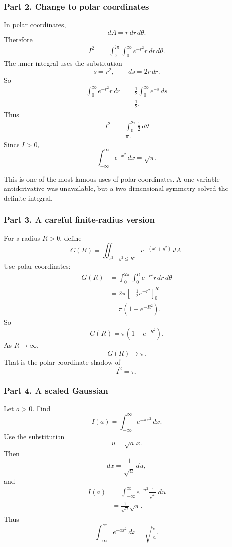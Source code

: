 \subsubsection*{Part 2. Change to polar coordinates}

In polar coordinates,
\[
    dA=r\,dr\,d\theta.
\]
Therefore
\[
\begin{aligned}
I^2
&=
\int_0^{2\pi}\int_0^\infty e^{-r^2}r\,dr\,d\theta.
\end{aligned}
\]
The inner integral uses the substitution
\[
    s=r^2,
    \qquad
    ds=2r\,dr.
\]
So
\[
\begin{aligned}
\int_0^\infty e^{-r^2}r\,dr
&=
\frac12\int_0^\infty e^{-s}\,ds\\
&=
\frac12.
\end{aligned}
\]
Thus
\[
\begin{aligned}
I^2
&=
\int_0^{2\pi}\frac12\,d\theta\\
&=
\pi.
\end{aligned}
\]
Since \(I>0\),
\[
\boxed{
    \int_{-\infty}^{\infty}e^{-x^2}\,dx=\sqrt{\pi}.
}
\]

This is one of the most famous uses of polar coordinates.  A one-variable antiderivative
was unavailable, but a two-dimensional symmetry solved the definite integral.

\subsubsection*{Part 3. A careful finite-radius version}

For a radius \(R>0\), define
\[
    G(R)=\iint_{x^2+y^2\le R^2} e^{-(x^2+y^2)}\,dA.
\]
Use polar coordinates:
\[
\begin{aligned}
G(R)
&=
\int_0^{2\pi}\int_0^R e^{-r^2}r\,dr\,d\theta\\
&=
2\pi\left[-\frac12e^{-r^2}\right]_0^R\\
&=
\pi(1-e^{-R^2}).
\end{aligned}
\]
So
\[
\boxed{
    G(R)=\pi(1-e^{-R^2}).
}
\]
As \(R\to\infty\),
\[
    G(R)\to\pi.
\]
That is the polar-coordinate shadow of
\[
    I^2=\pi.
\]

\subsubsection*{Part 4. A scaled Gaussian}

Let \(a>0\).  Find
\[
    I(a)=\int_{-\infty}^{\infty}e^{-ax^2}\,dx.
\]
Use the substitution
\[
    u=\sqrt a\,x.
\]
Then
\[
    dx=\frac{1}{\sqrt a}\,du,
\]
and
\[
\begin{aligned}
I(a)
&=
\int_{-\infty}^{\infty}e^{-u^2}\frac{1}{\sqrt a}\,du\\
&=
\frac{1}{\sqrt a}\sqrt\pi.
\end{aligned}
\]
Thus
\[
\boxed{
    \int_{-\infty}^{\infty}e^{-ax^2}\,dx
    =
    \sqrt{\frac{\pi}{a}}.
}
\]


